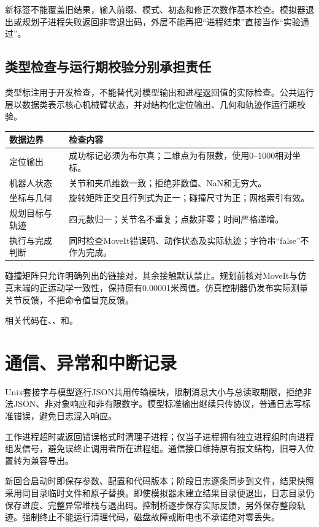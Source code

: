 新标签不能覆盖旧结果，输入前缀、模式、初态和修正次数作基本检查。模拟器退出或规划子进程失败返回非零退出码，外层不能再把“进程结束”直接当作“实验通过”。

\subsection{类型检查与运行期校验分别承担责任}
类型标注用于开发检查，不能替代对模型输出和进程返回值的实际检查。公共运行层以数据类表示核心机械臂状态，并对结构化定位输出、几何和轨迹作运行期校验。

\begin{longtable}{p{.23\linewidth}p{.66\linewidth}}
\toprule 数据边界 & 检查内容\\\midrule\endhead
定位输出 & 成功标记必须为布尔真；二维点为有限数，使用0--1000相对坐标。\\
机器人状态 & 关节和夹爪维数一致；拒绝非数值、NaN和无穷大。\\
坐标与几何 & 旋转矩阵正交且行列式为正一；碰撞尺寸为正；网格索引有效。\\
规划目标与轨迹 & 四元数归一；关节名不重复；点数非零；时间严格递增。\\
执行与完成判断 & 同时检查MoveIt错误码、动作状态及实际轨迹；字符串“false”不作为完成。\\
\bottomrule\end{longtable}

碰撞矩阵只允许明确列出的链接对，其余接触默认禁止。规划前核对MoveIt与仿真末端的正运动学一致性，保持原有0.00001米阈值。仿真控制器仍发布实际测量关节反馈，不把命令值冒充反馈。

相关代码在、、和。

\section{通信、异常和中断记录}
Unix套接字与模型逐行JSON共用传输模块，限制消息大小与总读取期限，拒绝非法JSON、非对象响应和非有限数字。模型标准输出继续只传协议，普通日志写标准错误，避免日志混入响应。

工作进程超时或返回错误格式时清理子进程；仅当子进程拥有独立进程组时向进程组发信号，避免误终止调用者所在进程组。通信接口维持原有报文结构，旧导入位置转为兼容导出。

新回合启动时即保存参数、配置和代码版本；阶段日志逐条同步到文件，结果快照采用同目录临时文件和原子替换。即使模拟器未建立结果目录便退出，日志目录仍保存进度、完整异常堆栈与退出码。控制桥逐步保存实际反馈，另外保存整段轨迹。强制终止不能运行清理代码，磁盘故障或断电也不承诺绝对零丢失。


